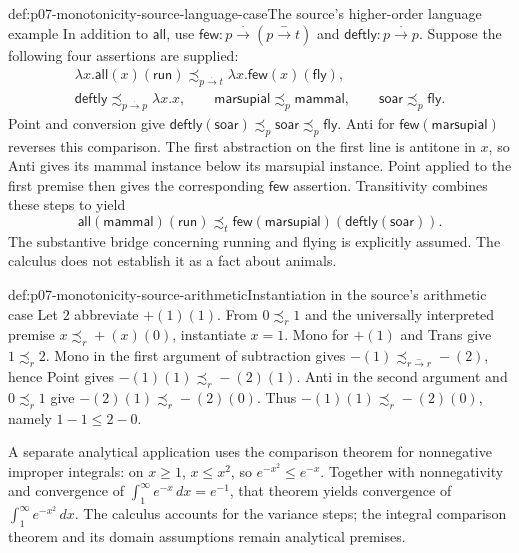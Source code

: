 \begin{hbexample}{def:p07-monotonicity-source-language-case}{The source's higher-order language example}
In addition to \(\mathsf{all}\), use
\(\mathsf{few}:p\xrightarrow{\cdot}(p\xrightarrow-t)\) and
\(\mathsf{deftly}:p\xrightarrow{\cdot}p\).
Suppose the following four assertions are supplied:
\[
 \begin{gathered}
 \lambda x.\mathsf{all}(x)(\mathsf{run})
   \precsim_{p\xrightarrow{\cdot}t}
 \lambda x.\mathsf{few}(x)(\mathsf{fly}),\\
 \mathsf{deftly}\precsim_{p\xrightarrow{\cdot}p}\lambda x.x,\qquad
 \mathsf{marsupial}\precsim_p\mathsf{mammal},\qquad
 \mathsf{soar}\precsim_p\mathsf{fly}.
 \end{gathered}
\]
Point and conversion give
\(\mathsf{deftly}(\mathsf{soar})\precsim_p\mathsf{soar}
 \precsim_p\mathsf{fly}\).
Anti for \(\mathsf{few}(\mathsf{marsupial})\) reverses this comparison.
The first abstraction on the first line is antitone in \(x\), so Anti
gives its mammal instance below its marsupial instance.
Point applied to the first premise then gives the corresponding
\(\mathsf{few}\) assertion. Transitivity combines these steps to yield
\[
 \mathsf{all}(\mathsf{mammal})(\mathsf{run})
 \precsim_t
 \mathsf{few}(\mathsf{marsupial})
                  (\mathsf{deftly}(\mathsf{soar})).
\]
The substantive bridge concerning running and flying is explicitly
assumed. The calculus does not establish it as a fact about animals.
\end{hbexample}

\begin{hbexample}{def:p07-monotonicity-source-arithmetic}{Instantiation in the source's arithmetic case}
Let \(2\) abbreviate \(+(1)(1)\). From \(0\precsim_r1\) and the
universally interpreted premise \(x\precsim_r +(x)(0)\), instantiate
\(x=1\). Mono for \(+(1)\) and Trans give \(1\precsim_r2\).
Mono in the first argument of subtraction gives
\(-(1)\precsim_{r\xrightarrow-r}-(2)\), hence Point gives
\(-(1)(1)\precsim_r-(2)(1)\).
Anti in the second argument and \(0\precsim_r1\) give
\(-(2)(1)\precsim_r-(2)(0)\). Thus
\(-(1)(1)\precsim_r-(2)(0)\), namely \(1-1\leq2-0\).

A separate analytical application uses the comparison theorem for
nonnegative improper integrals: on \(x\geq1\),
\(x\leq x^2\), so \(e^{-x^2}\leq e^{-x}\).
Together with nonnegativity and convergence of
\(\int_1^\infty e^{-x}\,dx=e^{-1}\), that theorem yields convergence of
\(\int_1^\infty e^{-x^2}\,dx\).
The calculus accounts for the variance steps; the integral comparison
theorem and its domain assumptions remain analytical premises.
\end{hbexample}

